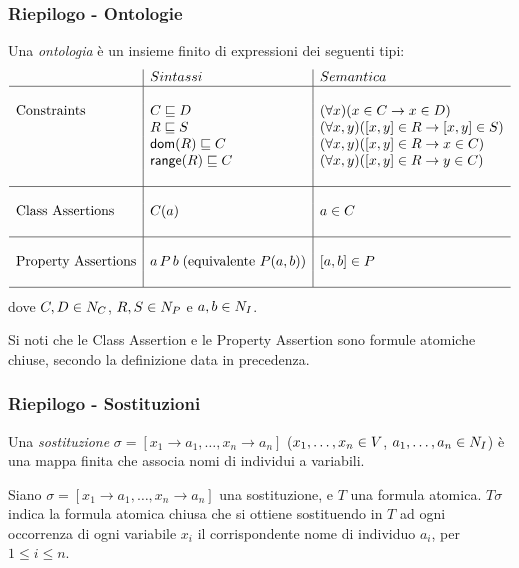 \documentclass[8pt]{beamer}
\begin{document}
\begin{frame}
\frametitle{Riepilogo - Ontologie}

Una \emph{ontologia} \`e un insieme finito di expressioni dei seguenti tipi:
\[
 \begin{array}{l|l|l}
  & Sintassi & Semantica \\
  \hline
  &&\\
  \mbox{Constraints} & C \sqsubseteq D & (\forall x)(x \in C \rightarrow x \in D) \\
  & R \sqsubseteq S & (\forall x, y)([x, y] \in R \rightarrow [x,y] \in S) \\
  & \mathsf{dom}(R) \sqsubseteq C & (\forall x, y)([x, y] \in R \rightarrow x \in C) \\
  & \mathsf{range}(R) \sqsubseteq C & (\forall x, y)([x, y] \in R \rightarrow y \in C) \\
  &&\\
  \hline
  &&\\
  \mbox{Class Assertions} & C(a) & a \in C\\
  &&\\
  \hline
  &&\\
  \mbox{Property Assertions} & a\,P\,b\;(\mbox{equivalente }P(a,b)) & [a,b] \in P \\
  &&\\
  \hline  
 \end{array}
\]
dove $C, D \in N_C$, $R, S \in N_P$ e $a, b \in N_I$.
\vspace{\baselineskip}

Si noti che le Class Assertion e le Property Assertion sono formule atomiche chiuse, secondo
la definizione data in precedenza.
\end{frame}

\begin{frame}
\frametitle{Riepilogo - Sostituzioni}
Una \emph{sostituzione} $\sigma=[x_1 \rightarrow a_1, \ldots, x_n \rightarrow a_n]$
($x_1, \ldots, x_n \in V$, $a_1, \ldots, a_n \in N_I$)
\`e una mappa finita che associa nomi di individui a variabili.
\vspace{\baselineskip}

Siano $\sigma=[x_1 \rightarrow a_1, \ldots, x_n \rightarrow a_n]$ una sostituzione,
e $T$ una formula atomica. $T\sigma$ indica la formula atomica chiusa che si ottiene
sostituendo in $T$ ad ogni occorrenza di ogni variabile $x_i$ il corrispondente
nome di individuo $a_i$, per $1\leq i \leq n$.
\end{frame}
\end{document}
